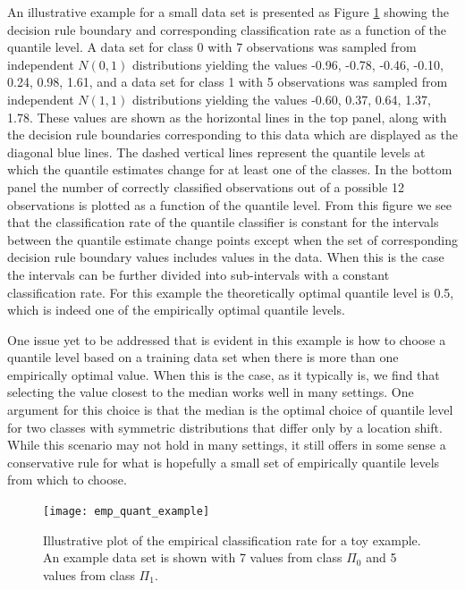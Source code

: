 An illustrative example for a small data set is presented as Figure
\ref{fig:empirical-classification-rate} showing the decision rule boundary and
corresponding classification rate as a function of the quantile level.  A data
set for class 0 with 7 observations was sampled from independent $N(0, 1)$
distributions yielding the values -0.96, -0.78, -0.46, -0.10, 0.24, 0.98, 1.61,
and a data set for class 1 with 5 observations was sampled from independent
$N(1, 1)$ distributions yielding the values -0.60, 0.37, 0.64, 1.37, 1.78.
These values are shown as the horizontal lines in the top panel, along with the
decision rule boundaries corresponding to this data which are displayed as the
diagonal blue lines.  The dashed vertical lines represent the quantile levels at
which the quantile estimates change for at least one of the classes.  In the
bottom panel the number of correctly classified observations out of a possible
12 observations is plotted as a function of the quantile level.  From this
figure we see that the classification rate of the quantile classifier is
constant for the intervals between the quantile estimate change points except
when the set of corresponding decision rule boundary values includes values in
the data.  When this is the case the intervals can be further divided into
sub-intervals with a constant classification rate.  For this example the
theoretically optimal quantile level is 0.5, which is indeed one of the
empirically optimal quantile levels.

One issue yet to be addressed that is evident in this example is how to choose a
quantile level based on a training data set when there is more than one
empirically optimal value.  When this is the case, as it typically is, we find
that selecting the value closest to the median works well in many settings.  One
argument for this choice is that the median is the optimal choice of quantile
level for two classes with symmetric distributions that differ only by a
location shift.  While this scenario may not hold in many settings, it still
offers in some sense a conservative rule for what is hopefully a small set of
empirically quantile levels from which to choose.

\begin{figure}[p]
  \caption[Example empirical classification rate]{Illustrative plot of the
    empirical classification rate for a toy example.  An example data set is
    shown with 7 values from class $\Pi_0$ and 5 values from class $\Pi_1$. }
  \label{fig:empirical-classification-rate}
  \centering
  \vspace{5mm}

  \texttt{[image: emp\_quant\_example]}
\end{figure}


